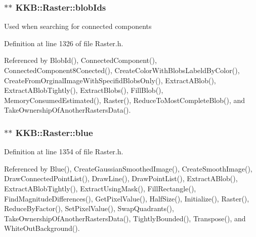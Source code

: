 \subsubsection[{\texorpdfstring{blob\+Ids}{blobIds}}]{$\ast$$\ast$ K\+K\+B\+::\+Raster\+::blob\+Ids\hspace{0.3cm}{\ttfamily [protected]}}\hypertarget{class_k_k_b_1_1_raster_a0fc9a1588e809db0b701f0a886bfd18c}{}\label{class_k_k_b_1_1_raster_a0fc9a1588e809db0b701f0a886bfd18c}
Used when searching for connected components 

Definition at line 1326 of file Raster.\+h.



Referenced by Blob\+Id(), Connected\+Component(), Connected\+Component8\+Conected(), Create\+Color\+With\+Blobs\+Labeld\+By\+Color(), Create\+From\+Orginal\+Image\+With\+Specifid\+Blobs\+Only(), Extract\+A\+Blob(), Extract\+A\+Blob\+Tightly(), Extract\+Blobs(), Fill\+Blob(), Memory\+Consumed\+Estimated(), Raster(), Reduce\+To\+Most\+Complete\+Blob(), and Take\+Ownership\+Of\+Another\+Rasters\+Data().

\subsubsection[{\texorpdfstring{blue}{blue}}]{$\ast$$\ast$ K\+K\+B\+::\+Raster\+::blue\hspace{0.3cm}{\ttfamily [protected]}}\hypertarget{class_k_k_b_1_1_raster_a0265be7ea30f5b1f9d6310a79bee868b}{}\label{class_k_k_b_1_1_raster_a0265be7ea30f5b1f9d6310a79bee868b}


Definition at line 1354 of file Raster.\+h.



Referenced by Blue(), Create\+Gaussian\+Smoothed\+Image(), Create\+Smooth\+Image(), Draw\+Connected\+Point\+List(), Draw\+Line(), Draw\+Point\+List(), Extract\+A\+Blob(), Extract\+A\+Blob\+Tightly(), Extract\+Using\+Mask(), Fill\+Rectangle(), Find\+Magnitude\+Differences(), Get\+Pixel\+Value(), Half\+Size(), Initialize(), Raster(), Reduce\+By\+Factor(), Set\+Pixel\+Value(), Swap\+Quadrants(), Take\+Ownership\+Of\+Another\+Rasters\+Data(), Tightly\+Bounded(), Transpose(), and White\+Out\+Background().

